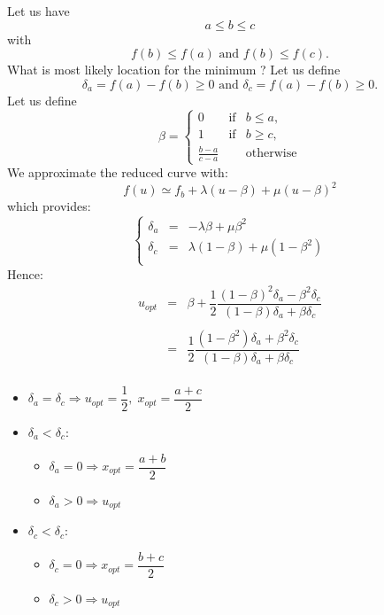\documentclass[aps,12pt]{revtex4}
\begin{document}

Let us have 
$$a \leq b \leq c$$ 
with 
$$f(b)\leq f(a) \text{ and } f(b)\leq f(c).$$
What is most likely location for the minimum ?
Let us define $$\delta_a = f(a)-f(b) \geq 0 \text{ and } \delta_c = f(a)-f(b)  \geq 0.$$ 
Let us define 
$$
	\beta = 
	\left\lbrace
	\begin{array}{rcl}
	0 & \text{if} & b\leq a,\\
	1 & \text{if} & b\geq c,\\
	\frac{b-a}{c-a} & & \text{otherwise}
	\end{array}
	\right.
$$
We approximate the reduced curve with:
$$
	f(u) \simeq f_b + \lambda (u-\beta)  + \mu (u-\beta)^2
$$
which provides:
$$
\left\lbrace
\begin{array}{rcl}
	\delta_a & = & -\lambda \beta + \mu \beta^2 \\
	\delta_c & = & \lambda(1-\beta) + \mu (1-\beta^2)\\
\end{array}
\right.
$$
Hence:
$$
\begin{array}{rcl}
	u_{opt} & = & \beta + \dfrac{1}{2} \dfrac{(1-\beta)^2 \delta_a - \beta^2 \delta_c }{(1-\beta)\delta_a + \beta \delta_c}\\
	\\
	 & = & \dfrac{1}{2} \dfrac{(1-\beta^2)\delta_a + \beta^2 \delta_c }{(1-\beta)\delta_a + \beta \delta_c}\\
\end{array}
$$

\begin{itemize}
\item $\delta_a=\delta_c \Rightarrow u_{opt}=\dfrac{1}{2}, \; x_{opt}= \dfrac{a+c}{2}$
\item $\delta_a<\delta_c$:
	\begin{itemize}
	\item $\delta_a=0 \Rightarrow x_{opt} = \dfrac{a+b}{2}$
	\item $\delta_a>0 \Rightarrow u_{opt}$
	\end{itemize}
\item $\delta_c<\delta_c$:
	\begin{itemize}
	\item $\delta_c=0 \Rightarrow x_{opt} = \dfrac{b+c}{2}$
	\item $\delta_c>0 \Rightarrow u_{opt}$
	\end{itemize}
\end{itemize}
\end{document}
